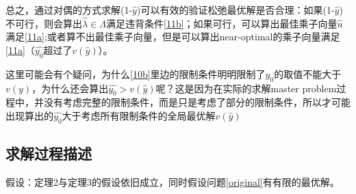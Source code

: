 \documentclass[UTF8,a4]{article}
\begin{document}
总之，通过对偶的方式求解(1-$\hat{y}$)可以有效的验证松弛最优解是否合理：如果(1-$\hat{y}$)不可行，则会算出$\hat{\lambda}\in\Lambda$满足违背条件\eqref{11b}；如果可行，可以算出最佳乘子向量$\hat{u}$满足\eqref{11a};或者算不出最佳乘子向量，但是可以算出near-optimal的乘子向量满足\eqref{11a}（$\hat{y_0}$超过了$v(\hat{y})$）。

这里可能会有个疑问，为什么\eqref{10b}里边的限制条件明明限制了$y_0$的取值不能大于$v(y)$，为什么还会算出$\hat{y_0}>v(\hat{y})$呢？这是因为在实际的求解master problem过程中，并没有考虑完整的限制条件，而是只是考虑了部分的限制条件，所以才可能出现算出的$\hat{y_0}$大于考虑所有限制条件的全局最优解$v(\hat{y})$
\subsection{求解过程描述}
假设：定理2与定理3的假设依旧成立，同时假设问题\eqref{original}有有限的最优解。
\end{document}
